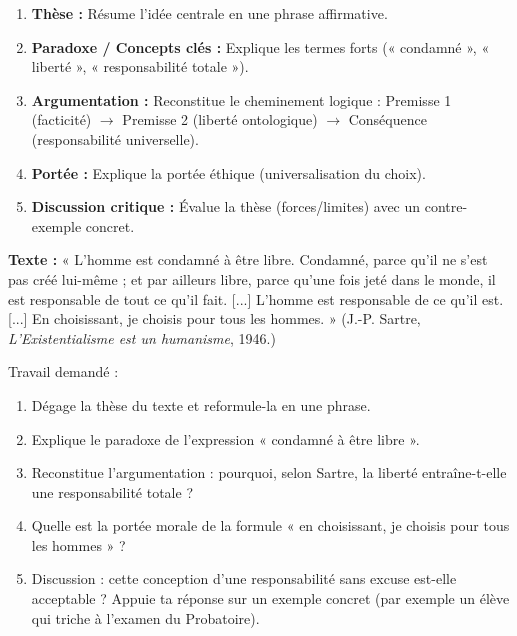 \documentclass[11pt]{article}
\newcommand{\cle}[1]{{\popxbold\color{popdark}#1}}
\begin{document}
\begin{methode}
\begin{enumerate}
\item \textbf{Thèse :} Résume l'idée centrale en une phrase affirmative.
\item \textbf{Paradoxe / Concepts clés :} Explique les termes forts (« condamné », « liberté », « responsabilité totale »).
\item \textbf{Argumentation :} Reconstitue le cheminement logique : Premisse 1 (facticité) $\rightarrow$ Premisse 2 (liberté ontologique) $\rightarrow$ Conséquence (responsabilité universelle).
\item \textbf{Portée :} Explique la portée éthique (universalisation du choix).
\item \textbf{Discussion critique :} Évalue la thèse (forces/limites) avec un contre-exemple concret.
\end{enumerate}
\end{methode}

\begin{exercice}
\textbf{Texte :} « L'homme est condamné à être libre. Condamné, parce qu'il ne s'est pas créé lui-même ; et par ailleurs libre, parce qu'une fois jeté dans le monde, il est responsable de tout ce qu'il fait. [...] L'homme est responsable de ce qu'il est. [...] En choisissant, je choisis pour tous les hommes. » (J.-P. Sartre, \emph{L'Existentialisme est un humanisme}, 1946.)

Travail demandé :
\begin{enumerate}
\item Dégage la \cle{thèse} du texte et reformule-la en une phrase.
\item Explique le paradoxe de l'expression « condamné à être libre ».
\item Reconstitue l'argumentation : pourquoi, selon Sartre, la liberté entraîne-t-elle une responsabilité totale ?
\item Quelle est la portée morale de la formule « en choisissant, je choisis pour tous les hommes » ?
\item Discussion : cette conception d'une responsabilité sans excuse est-elle acceptable ? Appuie ta réponse sur un exemple concret (par exemple un élève qui triche à l'examen du Probatoire).
\end{enumerate}
\end{exercice}
\end{document}
